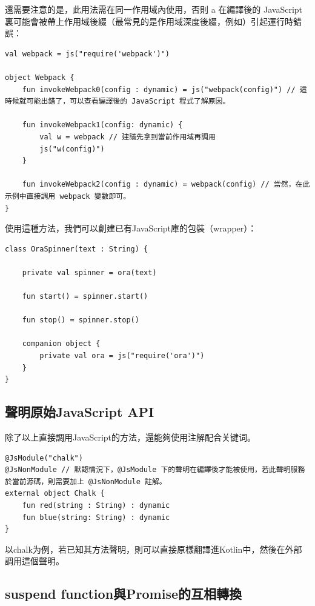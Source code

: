 還需要注意的是，此用法需在同一作用域內使用，否則 a 在編譯後的 JavaScript 裏可能會被帶上作用域後綴（最常見的是作用域深度後綴，例如）引起運行時錯誤：

\begin{lstlisting}
val webpack = js("require('webpack')")

object Webpack {
    fun invokeWebpack0(config : dynamic) = js("webpack(config)") // 這時候就可能出錯了，可以查看編譯後的 JavaScript 程式了解原因。

    fun invokeWebpack1(config: dynamic) {
        val w = webpack // 建議先拿到當前作用域再調用
        js("w(config)") 
    }

    fun invokeWebpack2(config : dynamic) = webpack(config) // 當然，在此示例中直接調用 webpack 變數即可。
}
\end{lstlisting}

使用這種方法，我們可以創建已有JavaScript庫的包裝（wrapper）：

\begin{lstlisting}
class OraSpinner(text : String) {

    private val spinner = ora(text)

    fun start() = spinner.start()

    fun stop() = spinner.stop()

    companion object {
        private val ora = js("require('ora')")
    }
}
\end{lstlisting}

\subsection*{聲明原始JavaScript API}

除了以上直接調用JavaScript的方法，還能夠使用注解配合关键词。

\begin{lstlisting}
@JsModule("chalk")
@JsNonModule // 默認情況下，@JsModule 下的聲明在編譯後才能被使用，若此聲明服務於當前源碼，則需要加上 @JsNonModule 註解。
external object Chalk {
    fun red(string : String) : dynamic
    fun blue(string: String) : dynamic
}
\end{lstlisting}

以chalk为例，若已知其方法聲明，則可以直接原樣翻譯進Kotlin中，然後在外部調用這個聲明。

\subsection*{suspend function與Promise的互相轉換}

